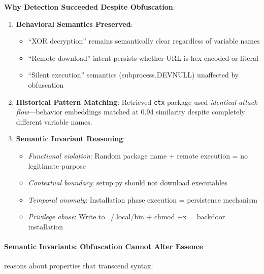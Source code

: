 \textbf{Why Detection Succeeded Despite Obfuscation}:
\begin{enumerate}
    \item \textbf{Behavioral Semantics Preserved}: 
    \begin{itemize}
        \item ``XOR decryption'' remains semantically clear regardless of variable names
        \item ``Remote download'' intent persists whether URL is hex-encoded or literal
        \item ``Silent execution'' semantics (subprocess.DEVNULL) unaffected by obfuscation
    \end{itemize}
    
    \item \textbf{Historical Pattern Matching}: Retrieved \texttt{ctx} package used \emph{identical attack flow}---behavior embeddings matched at 0.94 similarity despite completely different variable names.
    
    \item \textbf{Semantic Invariant Reasoning}:
    \begin{itemize}
        \item \emph{Functional violation}: Random package name + remote execution = no legitimate purpose
        \item \emph{Contextual boundary}: setup.py should not download executables
        \item \emph{Temporal anomaly}: Installation phase execution = persistence mechanism
        \item \emph{Privilege abuse}: Write to ~/.local/bin + chmod +x = backdoor installation
    \end{itemize}
\end{enumerate}

\paragraph{Semantic Invariants: Obfuscation Cannot Alter Essence}

\tool{} reasons about properties that transcend syntax:

